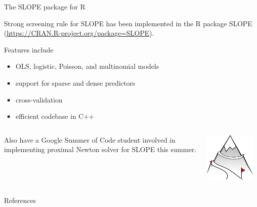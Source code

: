\documentclass[10pt,ignorenonframetext]{beamer}
\newif\ifbibliography
\newcommand{\pkg}[1]{\textsf{#1}}
\begin{document}
\begin{frame}{The SLOPE package for R}

Strong screening rule for SLOPE has been implemented in the R package
SLOPE (\url{https://CRAN.R-project.org/package=SLOPE}). \medskip

Features include
\begin{itemize}
    \item OLS, logistic, Poisson, and multinomial models
    \item support for sparse and dense predictors
    \item cross-validation
    \item efficient codebase in \pkg{C++}
\end{itemize}
\begin{columns}[T]
\begin{column}{0.65\linewidth}
Also have a Google Summer of Code student involved in implementing
proximal Newton solver for SLOPE this summer.
\end{column}
\begin{column}{0.25\linewidth}
\begin{center}
\includegraphics[width=\linewidth]{figures/logo.pdf}
\end{center}
\end{column}
\end{columns}
\end{frame}



\begin{frame}[allowframebreaks]{References}
  \bibliographytrue
  \printbibliography[heading=none]
\end{frame}
\end{document}
